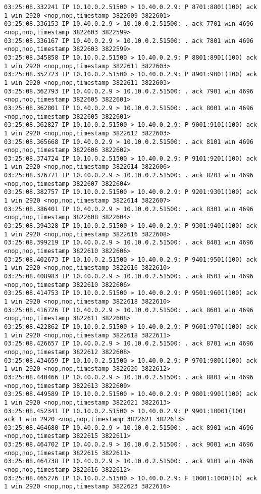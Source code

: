 \documentclass[a4paper,12pt]{article}
\begin{document}
\begin{lstlisting}
03:25:08.332241 IP 10.10.0.2.51500 > 10.40.0.2.9: P 8701:8801(100) ack 1 win 2920 <nop,nop,timestamp 3822609 3822601>
03:25:08.336153 IP 10.40.0.2.9 > 10.10.0.2.51500: . ack 7701 win 4696 <nop,nop,timestamp 3822603 3822599>
03:25:08.336167 IP 10.40.0.2.9 > 10.10.0.2.51500: . ack 7801 win 4696 <nop,nop,timestamp 3822603 3822599>
03:25:08.345858 IP 10.10.0.2.51500 > 10.40.0.2.9: P 8801:8901(100) ack 1 win 2920 <nop,nop,timestamp 3822611 3822603>
03:25:08.352723 IP 10.10.0.2.51500 > 10.40.0.2.9: P 8901:9001(100) ack 1 win 2920 <nop,nop,timestamp 3822611 3822603>
03:25:08.362793 IP 10.40.0.2.9 > 10.10.0.2.51500: . ack 7901 win 4696 <nop,nop,timestamp 3822605 3822601>
03:25:08.362801 IP 10.40.0.2.9 > 10.10.0.2.51500: . ack 8001 win 4696 <nop,nop,timestamp 3822605 3822601>
03:25:08.362827 IP 10.10.0.2.51500 > 10.40.0.2.9: P 9001:9101(100) ack 1 win 2920 <nop,nop,timestamp 3822612 3822603>
03:25:08.365668 IP 10.40.0.2.9 > 10.10.0.2.51500: . ack 8101 win 4696 <nop,nop,timestamp 3822606 3822602>
03:25:08.374724 IP 10.10.0.2.51500 > 10.40.0.2.9: P 9101:9201(100) ack 1 win 2920 <nop,nop,timestamp 3822614 3822606>
03:25:08.376771 IP 10.40.0.2.9 > 10.10.0.2.51500: . ack 8201 win 4696 <nop,nop,timestamp 3822607 3822604>
03:25:08.382757 IP 10.10.0.2.51500 > 10.40.0.2.9: P 9201:9301(100) ack 1 win 2920 <nop,nop,timestamp 3822614 3822607>
03:25:08.386401 IP 10.40.0.2.9 > 10.10.0.2.51500: . ack 8301 win 4696 <nop,nop,timestamp 3822608 3822604>
03:25:08.394328 IP 10.10.0.2.51500 > 10.40.0.2.9: P 9301:9401(100) ack 1 win 2920 <nop,nop,timestamp 3822616 3822608>
03:25:08.399219 IP 10.40.0.2.9 > 10.10.0.2.51500: . ack 8401 win 4696 <nop,nop,timestamp 3822610 3822606>
03:25:08.402673 IP 10.10.0.2.51500 > 10.40.0.2.9: P 9401:9501(100) ack 1 win 2920 <nop,nop,timestamp 3822616 3822610>
03:25:08.408983 IP 10.40.0.2.9 > 10.10.0.2.51500: . ack 8501 win 4696 <nop,nop,timestamp 3822610 3822606>
03:25:08.414753 IP 10.10.0.2.51500 > 10.40.0.2.9: P 9501:9601(100) ack 1 win 2920 <nop,nop,timestamp 3822618 3822610>
03:25:08.416726 IP 10.40.0.2.9 > 10.10.0.2.51500: . ack 8601 win 4696 <nop,nop,timestamp 3822611 3822608>
03:25:08.422862 IP 10.10.0.2.51500 > 10.40.0.2.9: P 9601:9701(100) ack 1 win 2920 <nop,nop,timestamp 3822618 3822611>
03:25:08.426657 IP 10.40.0.2.9 > 10.10.0.2.51500: . ack 8701 win 4696 <nop,nop,timestamp 3822612 3822608>
03:25:08.434659 IP 10.10.0.2.51500 > 10.40.0.2.9: P 9701:9801(100) ack 1 win 2920 <nop,nop,timestamp 3822620 3822612>
03:25:08.440466 IP 10.40.0.2.9 > 10.10.0.2.51500: . ack 8801 win 4696 <nop,nop,timestamp 3822613 3822609>
03:25:08.449589 IP 10.10.0.2.51500 > 10.40.0.2.9: P 9801:9901(100) ack 1 win 2920 <nop,nop,timestamp 3822621 3822613>
03:25:08.452341 IP 10.10.0.2.51500 > 10.40.0.2.9: P 9901:10001(100) ack 1 win 2920 <nop,nop,timestamp 3822621 3822613>
03:25:08.464680 IP 10.40.0.2.9 > 10.10.0.2.51500: . ack 8901 win 4696 <nop,nop,timestamp 3822615 3822611>
03:25:08.464702 IP 10.40.0.2.9 > 10.10.0.2.51500: . ack 9001 win 4696 <nop,nop,timestamp 3822615 3822611>
03:25:08.464738 IP 10.40.0.2.9 > 10.10.0.2.51500: . ack 9101 win 4696 <nop,nop,timestamp 3822616 3822612>
03:25:08.465276 IP 10.10.0.2.51500 > 10.40.0.2.9: F 10001:10001(0) ack 1 win 2920 <nop,nop,timestamp 3822623 3822616>


\end{lstlisting}
\end{document}
